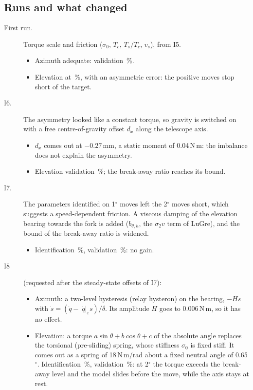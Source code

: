 \documentclass[10pt,a4paper]{article}
\numberwithin{equation}{section}
\begin{document}
\subsection{Runs and what changed}
\begin{description}
\item[First run.] Torque scale and friction ($\sigma_0$, $T_c$, $T_s/T_c$, $v_s$), from I5.
  \begin{itemize}
  \item Azimuth adequate: validation \ciROneAzVal\,\%.
  \item Elevation at \ciROneElVal\,\%, with an asymmetric error: the positive moves stop short of the target.
  \end{itemize}
\item[I6.] The asymmetry looked like a constant torque, so gravity is switched on with a free centre-of-gravity offset $d_x$ along the telescope axis.
  \begin{itemize}
  \item $d_x$ comes out at $-0.27$\,mm, a static moment of 0.04\,N\,m: the imbalance does not explain the asymmetry.
  \item Elevation validation \ciISixElVal\,\%; the break-away ratio reaches its bound.
  \end{itemize}
\item[I7.] The parameters identified on 1$^\circ$ moves left the 2$^\circ$ moves short, which suggests a speed-dependent friction. A viscous damping of the elevation bearing towards the fork is added ($b_{\theta,h}$, the $\sigma_2v$ term of LuGre), and the bound of the break-away ratio is widened.
  \begin{itemize}
  \item Identification \ciISevenElIde\,\%, validation \ciISevenElVal\,\%: no gain.
  \end{itemize}
\item[I8] (requested after the steady-state offsets of I7):
  \begin{itemize}
  \item Azimuth: a two-level hysteresis (relay hysteron) on the bearing, $-H s$ with $\dot s=(\dot q-|\dot q|_\varepsilon s)/\delta$. Its amplitude $H$ goes to 0.006\,N\,m, so it has no effect.
  \item Elevation: a torque $a\sin\theta+b\cos\theta+c$ of the absolute angle replaces the torsional (pre-sliding) spring, whose stiffness $\sigma_0$ is fixed stiff. It comes out as a spring of 18\,N\,m/rad about a fixed neutral angle of 0.65$^\circ$. Identification \ciIEightElIde\,\%, validation \ciIEightElVal\,\%: at 2$^\circ$ the torque exceeds the break-away level and the model slides before the move, while the axis stays at rest.

\end{itemize}
\end{description}
\end{document}
